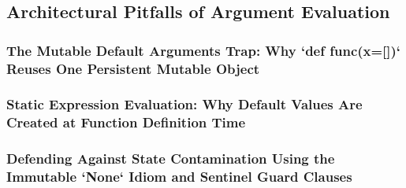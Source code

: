 \subsection{Architectural Pitfalls of Argument Evaluation}
\subsubsection{The Mutable Default Arguments Trap: Why `def func(x=[])` Reuses One Persistent Mutable Object}
\subsubsection{Static Expression Evaluation: Why Default Values Are Created at Function Definition Time}
\subsubsection{Defending Against State Contamination Using the Immutable `None` Idiom and Sentinel Guard Clauses}
